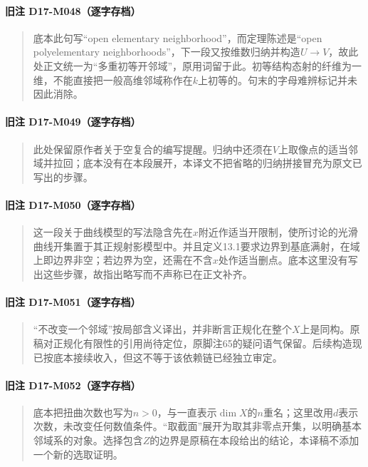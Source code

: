 \documentclass[UTF8,a4paper]{ctexbook}
\begin{document}
\paragraph*{旧注 D17-M048（逐字存档）}
\begin{quote}
底本此句写“open elementary neighborhood”，而定理陈述是“open polyelementary neighborhoods”，下一段又按维数归纳并构造$U\to V$，故此处正文统一为“多重初等开邻域”，原用词留于此。初等结构态射的纤维为一维，不能直接把一般高维邻域称作在$k$上初等的。句末的字母难辨标记并未因此消除。
\end{quote}

\paragraph*{旧注 D17-M049（逐字存档）}
\begin{quote}
此处保留原作者关于空复合的编写提醒。归纳中还须在$V$上取像点的适当邻域并拉回；底本没有在本段展开，本译文不把省略的归纳拼接冒充为原文已写出的步骤。
\end{quote}

\paragraph*{旧注 D17-M050（逐字存档）}
\begin{quote}
这一段关于曲线模型的写法隐含先在$x$附近作适当开限制，使所讨论的光滑曲线开集置于其正规射影模型中。并且定义13.1要求边界到基底满射，在域上即边界非空；若边界为空，还需在不含$x$处作适当删点。底本这里没有写出这些步骤，故指出略写而不声称已在正文补齐。
\end{quote}

\paragraph*{旧注 D17-M051（逐字存档）}
\begin{quote}
“不改变一个邻域”按局部含义译出，并非断言正规化在整个$X$上是同构。原稿对正规化有限性的引用尚待定位，原脚注65的疑问语气保留。后续构造现已按底本接续收入，但这不等于该依赖链已经独立审定。
\end{quote}

\paragraph*{旧注 D17-M052（逐字存档）}
\begin{quote}
底本把扭曲次数也写为$n>0$，与一直表示$\dim X$的$n$重名；这里改用$d$表示次数，未改变任何数值条件。“取截面”展开为取其非零点开集，以明确基本邻域系的对象。选择包含$Z$的边界是原稿在本段给出的结论，本译稿不添加一个新的选取证明。
\end{quote}
\end{document}
